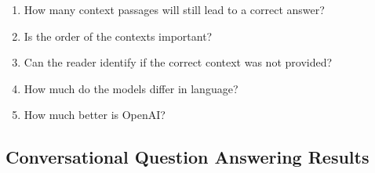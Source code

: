 \begin{enumerate}
    \item How many context passages will still lead to a correct answer?
    \item Is the order of the contexts important?
    \item Can the reader identify if the correct context was not provided?
    \item How much do the models differ in language?
    \item How much better is OpenAI?
\end{enumerate}

\subsection{Conversational Question Answering Results}
\label{subsec:convqa-results}

